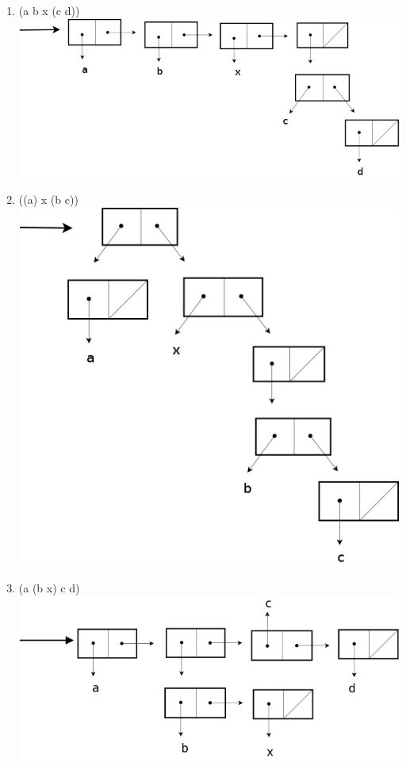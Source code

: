 \documentclass[a4paper, 11pt]{article}
\begin{document}
\begin{enumerate}
    \item (a b x (c d))\\ \includegraphics[scale=0.3]{reponse1.png}
    \item ((a) x (b c))\\ \includegraphics[scale=0.3]{reponse2.png}
    \item (a (b x) c d)\\ \includegraphics[scale=0.3]{reponse3.png}

\end{enumerate}
\end{document}
